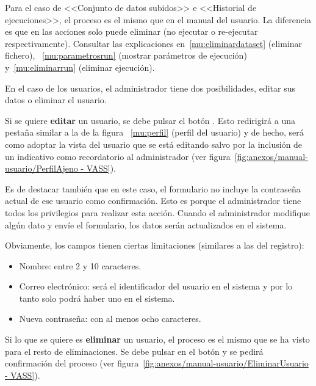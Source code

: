 Para el caso de <<Conjunto de datos subidos>> e <<Historial de ejecuciones>>, el
proceso es el mismo que en el manual del usuario. La diferencia es que en las
acciones solo puede eliminar (no ejecutar o re-ejecutar respectivamente).
Consultar las explicaciones  en~\ref{mu:eliminardataset} (eliminar fichero),
~\ref{mu:parametrosrun} (mostrar parámetros de ejecución) y~\ref{mu:eliminarrun}
(eliminar ejecución).

En el caso de los usuarios, el administrador tiene dos posibilidades, editar sus
datos o eliminar el usuario.

Si se quiere \textbf{editar} un usuario, se debe pulsar el botón
\button[vassgreen]{\faPencil}. Esto redirigirá a una pestaña similar a la de la
figura ~\ref{mu:perfil} (perfil del usuario) y de hecho, será como adoptar la
vista del usuario que se está editando salvo por la inclusión de un indicativo
como recordatorio al administrador (ver
figura~\ref{fig:anexos/manual-usuario/PerfilAjeno - VASS}).


Es de destacar también que en este caso, el formulario no incluye la contraseña
actual de ese usuario como confirmación. Esto es porque el administrador tiene
todos los privilegios para realizar esta acción. Cuando el administrador
modifique algún dato y envíe el formulario, los datos serán actualizados en el
sistema. 

Obviamente, los campos tienen ciertas limitaciones (similares a las del
registro):
\begin{itemize}
    \item Nombre: entre 2 y 10 caracteres.
    \item Correo electrónico: será el identificador del usuario en el sistema y
    por lo tanto solo podrá haber uno en el sistema.
    \item Nueva contraseña: con al menos ocho caracteres.
\end{itemize}

Si lo que se quiere es \textbf{eliminar} un usuario, el proceso es el mismo que
se ha visto para el resto de eliminaciones. Se debe pulsar en el botón
\button[vassred]{\faTrash} y se pedirá confirmación del proceso (ver
figura~\ref{fig:anexos/manual-usuario/EliminarUsuario - VASS}).

